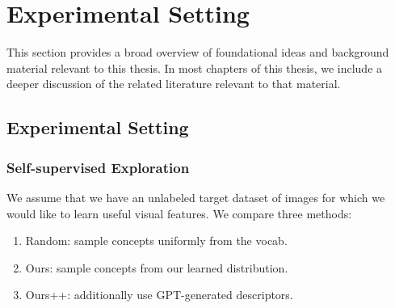 \chapter{Experimental Setting}
This section provides a broad overview of foundational ideas
and background material relevant to this thesis.
In most chapters of this thesis, we include a deeper
discussion of the related literature relevant to
that material.

\section{Experimental Setting}
\subsection{Self-supervised Exploration}
We assume that we have an unlabeled target dataset of images for which we would like to learn useful visual features. We compare three methods:
\begin{enumerate}[noitemsep,topsep=0pt]
    \item Random: sample concepts uniformly from the vocab. 
    \item Ours: sample concepts from our learned distribution. 
    \item Ours++: additionally use GPT-generated descriptors.
\end{enumerate}

